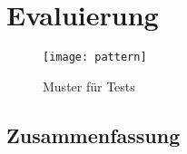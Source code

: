 \chapter{Evaluierung}



\begin{figure}[bht]
  \begin{center}
    \texttt{[image: pattern]}
    \caption{Muster für Tests}
    \label{fig.pattern}
  \end{center}
\end{figure}








\section{Zusammenfassung}
